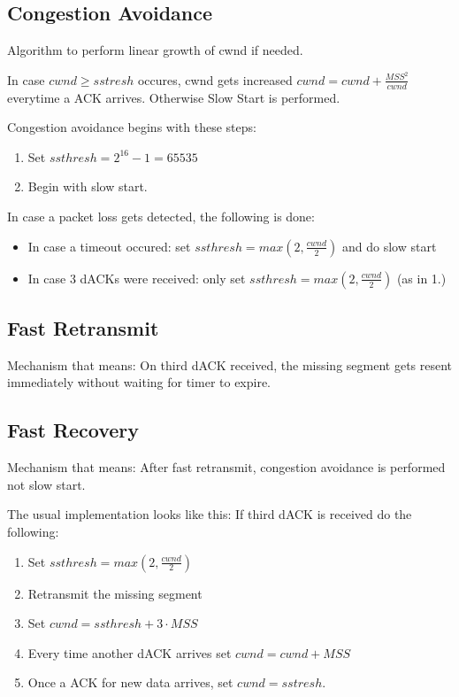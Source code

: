 \documentclass{article}
\begin{document}
\subsection{Congestion Avoidance}
Algorithm to perform linear growth of cwnd if needed.

In case $cwnd \geq sstresh$ occures, cwnd gets increased $cwnd = cwnd + \frac{MSS^{2}}{cwnd}$ everytime a ACK arrives. Otherwise Slow Start is performed.

Congestion avoidance begins with these steps:

\begin{enumerate}
     \item Set $ssthresh = 2^{16} -1 = 65535$
     \item Begin with slow start.
\end{enumerate}

In case a packet loss gets detected, the following is done:

\begin{itemize}
     \item In case a timeout occured: set $ssthresh = max(2, \frac{cwnd}{2})$ and do slow start
     \item In case 3 dACKs were received: only set $ssthresh = max(2, \frac{cwnd}{2})$ (as in 1.)
\end{itemize}

\subsection{Fast Retransmit}
Mechanism that means: On third dACK received, the missing segment gets resent immediately without waiting for timer to expire.

\subsection{Fast Recovery}
Mechanism that means: After fast retransmit, congestion avoidance is performed not slow start.

The usual implementation looks like this: If third dACK is received do the following:

\begin{enumerate}
     \item Set $ssthresh = max(2, \frac{cwnd}{2})$
     \item Retransmit the missing segment
     \item Set $cwnd = ssthresh + 3 \cdot MSS$
     \item Every time another dACK arrives set $cwnd = cwnd + MSS$
     \item Once a ACK for new data arrives, set $cwnd = sstresh$.
\end{enumerate}
\end{document}
